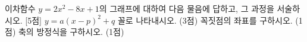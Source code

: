 이차함수 $y=2x^2-8x+1$의 그래프에 대하여 다음 물음에 답하고, 그 과정을 서술하시오. \mbox{[5점]}
 $y=a(x-p)^2+q$ 꼴로 나타내시오. (3점)
 꼭짓점의 좌표를 구하시오. (1점)
 축의 방정식을 구하시오. (1점)
